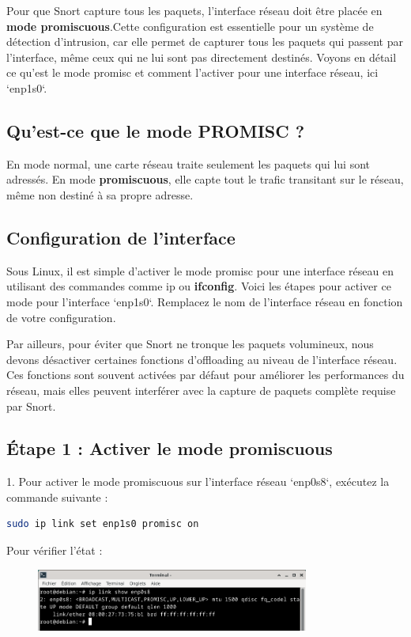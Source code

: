 \documentclass[12pt]{article}
\begin{document}
Pour que Snort capture tous les paquets, l’interface réseau doit être placée en \textbf{mode promiscuous}.Cette configuration est essentielle pour un système de détection d’intrusion, car elle permet de capturer tous les paquets qui passent par l’interface, même ceux qui ne lui sont pas directement destinés. Voyons en détail ce qu’est le mode promisc et comment l’activer pour une interface réseau, ici `enp1s0`.

\subsection*{Qu’est-ce que le mode PROMISC ?}

En mode normal, une carte réseau traite seulement les paquets qui lui sont adressés. En mode \textbf{promiscuous}, elle capte tout le trafic transitant sur le réseau, même non destiné à sa propre adresse.

\subsection*{Configuration de l'interface}
Sous Linux, il est simple d’activer le mode promisc pour une interface réseau en utilisant des commandes comme ip ou \textbf{ifconfig}. Voici les étapes pour activer ce mode pour l’interface `enp1s0`. Remplacez le nom de l’interface réseau en fonction de votre configuration.

Par ailleurs, pour éviter que Snort ne tronque les paquets volumineux, nous devons désactiver certaines fonctions d’offloading au niveau de l’interface réseau. Ces fonctions sont souvent activées par défaut pour améliorer les performances du réseau, mais elles peuvent interférer avec la capture de paquets complète requise par Snort.

\subsection*{Étape 1 : Activer le mode promiscuous}

1. Pour activer le mode promiscuous sur l’interface réseau `enp0s8`, exécutez la commande suivante :
\begin{lstlisting}[language=bash]
sudo ip link set enp1s0 promisc on
\end{lstlisting}

Pour vérifier l’état :

\begin{figure}[H] %
    \centering
    \includegraphics[width=0.8\textwidth]{captures/Pasted image 20250604070119.png}
    \label{fig:mon_image}
\end{figure}
\end{document}
